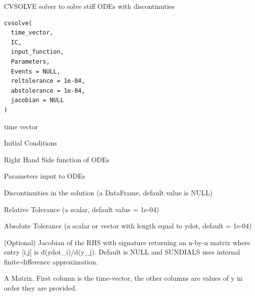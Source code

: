 \documentclass[letterpaper]{book}
\begin{document}
%
\begin{Description}
CVSOLVE solver to solve stiff ODEs with discontinuties
\end{Description}
%
\begin{Usage}
\begin{verbatim}
cvsolve(
  time_vector,
  IC,
  input_function,
  Parameters,
  Events = NULL,
  reltolerance = 1e-04,
  abstolerance = 1e-04,
  jacobian = NULL
)
\end{verbatim}
\end{Usage}
%
\begin{Arguments}
\begin{ldescription}
\item[\code{time\_vector}] time vector

\item[\code{IC}] Initial Conditions

\item[\code{input\_function}] Right Hand Side function of ODEs

\item[\code{Parameters}] Parameters input to ODEs

\item[\code{Events}] Discontinuities in the solution (a DataFrame, default value is NULL)

\item[\code{reltolerance}] Relative Tolerance (a scalar, default value  = 1e-04)

\item[\code{abstolerance}] Absolute Tolerance (a scalar or vector with length equal to ydot, default = 1e-04)

\item[\code{jacobian}] (Optional) Jacobian of the RHS with signature  returning an n-by-n matrix where entry [i,j] is d(ydot\_i)/d(y\_j). Default is NULL and SUNDIALS uses internal finite-difference approximation.
\end{ldescription}
\end{Arguments}
%
\begin{Value}
A Matrix. First column is the time-vector, the other columns are values of y in order they are provided.
\end{Value}
%
\end{document}
